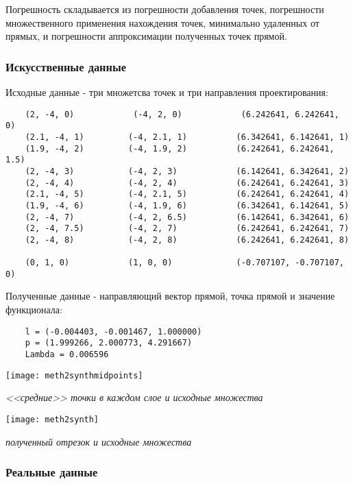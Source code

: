 Погрешность складывается из погрешности добавления точек, погрешности множественного применения нахождения точек, минимально удаленных от прямых, и погрешности аппроксимации полученных точек прямой.\\

\newpage
\subsubsection{Искусственные данные}\label{math2:error:synth}

Исходные данные - три множетсва точек и три направления проектирования:

\begin{verbatim}
	(2, -4, 0)	          (-4, 2, 0)            (6.242641, 6.242641, 0)
	(2.1, -4, 1)         (-4, 2.1, 1)          (6.342641, 6.142641, 1)
	(1.9, -4, 2)         (-4, 1.9, 2)          (6.242641, 6.242641, 1.5)
	(2, -4, 3)           (-4, 2, 3)            (6.142641, 6.342641, 2)
	(2, -4, 4)           (-4, 2, 4)            (6.242641, 6.242641, 3)
	(2.1, -4, 5)         (-4, 2.1, 5)          (6.242641, 6.242641, 4)
	(1.9, -4, 6)         (-4, 1.9, 6)          (6.342641, 6.142641, 5)
	(2, -4, 7)           (-4, 2, 6.5)          (6.142641, 6.342641, 6)
	(2, -4, 7.5)         (-4, 2, 7)            (6.242641, 6.242641, 7)
	(2, -4, 8)           (-4, 2, 8)            (6.242641, 6.242641, 8)

	(0, 1, 0)            (1, 0, 0)             (-0.707107, -0.707107, 0)
\end{verbatim}

Полученные данные - направляющий вектор прямой, точка прямой и значение функционала:

\begin{verbatim}
	l = (-0.004403, -0.001467, 1.000000)
	p = (1.999266, 2.000773, 4.291667)
	Lambda = 0.006596
\end{verbatim}

\begin{center}
	\texttt{[image: meth2synthmidpoints]}

	\textit{<<средние>> точки в каждом слое и исходные множества}

	\texttt{[image: meth2synth]}

	\textit{полученный отрезок и исходные множества}
\end{center}

\subsubsection{Реальные данные}\label{math2:error:real}

